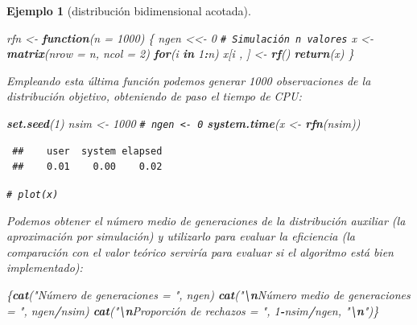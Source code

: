 \documentclass[
  spanish,
  10pt,
]{book}
\newenvironment{Shaded}{\begin{snugshade}}{\end{snugshade}}
\newcommand{\AttributeTok}[1]{\textcolor[rgb]{0.13,0.29,0.53}{#1}}
\newcommand{\CommentTok}[1]{\textcolor[rgb]{0.56,0.35,0.01}{\textit{#1}}}
\newcommand{\ControlFlowTok}[1]{\textcolor[rgb]{0.13,0.29,0.53}{\textbf{#1}}}
\newcommand{\DecValTok}[1]{\textcolor[rgb]{0.00,0.00,0.81}{#1}}
\newcommand{\FunctionTok}[1]{\textcolor[rgb]{0.13,0.29,0.53}{\textbf{#1}}}
\newcommand{\NormalTok}[1]{#1}
\newcommand{\OtherTok}[1]{\textcolor[rgb]{0.56,0.35,0.01}{#1}}
\newcommand{\SpecialCharTok}[1]{\textcolor[rgb]{0.81,0.36,0.00}{\textbf{#1}}}
\newcommand{\StringTok}[1]{\textcolor[rgb]{0.31,0.60,0.02}{#1}}
\theoremstyle{break}
\newtheorem{example}{Ejemplo}[chapter]
\theoremstyle{nonumberplain}
\renewcommand{\CommentTok}[1]{\textcolor[rgb]{0.41,0.41,0.41}{\texttt{#1}}}
\begin{document}
\begin{example}[distribución bidimensional acotada]
\begin{Shaded}
\begin{Highlighting}[]
\NormalTok{rfn }\OtherTok{\textless{}{-}} \ControlFlowTok{function}\NormalTok{(}\AttributeTok{n =} \DecValTok{1000}\NormalTok{) \{}
\NormalTok{  ngen }\OtherTok{\textless{}\textless{}{-}} \DecValTok{0}
  \CommentTok{\# Simulación n valores}
\NormalTok{  x }\OtherTok{\textless{}{-}} \FunctionTok{matrix}\NormalTok{(}\AttributeTok{nrow =}\NormalTok{ n, }\AttributeTok{ncol =} \DecValTok{2}\NormalTok{)}
  \ControlFlowTok{for}\NormalTok{(i }\ControlFlowTok{in} \DecValTok{1}\SpecialCharTok{:}\NormalTok{n) x[i , ] }\OtherTok{\textless{}{-}} \FunctionTok{rf}\NormalTok{()}
  \FunctionTok{return}\NormalTok{(x)}
\NormalTok{\}}
\end{Highlighting}
\end{Shaded}

Empleando esta última función podemos generar 1000 observaciones de la
distribución objetivo, obteniendo de paso el tiempo de CPU:

\begin{Shaded}
\begin{Highlighting}[]
\FunctionTok{set.seed}\NormalTok{(}\DecValTok{1}\NormalTok{)}
\NormalTok{nsim }\OtherTok{\textless{}{-}} \DecValTok{1000}
\CommentTok{\# ngen \textless{}{-} 0}
\FunctionTok{system.time}\NormalTok{(x }\OtherTok{\textless{}{-}} \FunctionTok{rfn}\NormalTok{(nsim))}
\end{Highlighting}
\end{Shaded}

\begin{verbatim}
 ##    user  system elapsed 
 ##    0.01    0.00    0.02
\end{verbatim}

\begin{Shaded}
\begin{Highlighting}[]
\CommentTok{\# plot(x)}
\end{Highlighting}
\end{Shaded}

Podemos obtener el número medio de generaciones de la distribución auxiliar
(la aproximación por simulación) y utilizarlo para evaluar la eficiencia
(la comparación con el valor teórico serviría para evaluar si el algoritmo
está bien implementado):

\begin{Shaded}
\begin{Highlighting}[]
\NormalTok{\{}\FunctionTok{cat}\NormalTok{(}\StringTok{"Número de generaciones = "}\NormalTok{, ngen)}
\FunctionTok{cat}\NormalTok{(}\StringTok{"}\SpecialCharTok{\textbackslash{}n}\StringTok{Número medio de generaciones = "}\NormalTok{, ngen}\SpecialCharTok{/}\NormalTok{nsim)}
\FunctionTok{cat}\NormalTok{(}\StringTok{"}\SpecialCharTok{\textbackslash{}n}\StringTok{Proporción de rechazos = "}\NormalTok{, }\DecValTok{1}\SpecialCharTok{{-}}\NormalTok{nsim}\SpecialCharTok{/}\NormalTok{ngen, }\StringTok{"}\SpecialCharTok{\textbackslash{}n}\StringTok{"}\NormalTok{)\}}
\end{Highlighting}
\end{Shaded}


\end{example}
\end{document}
